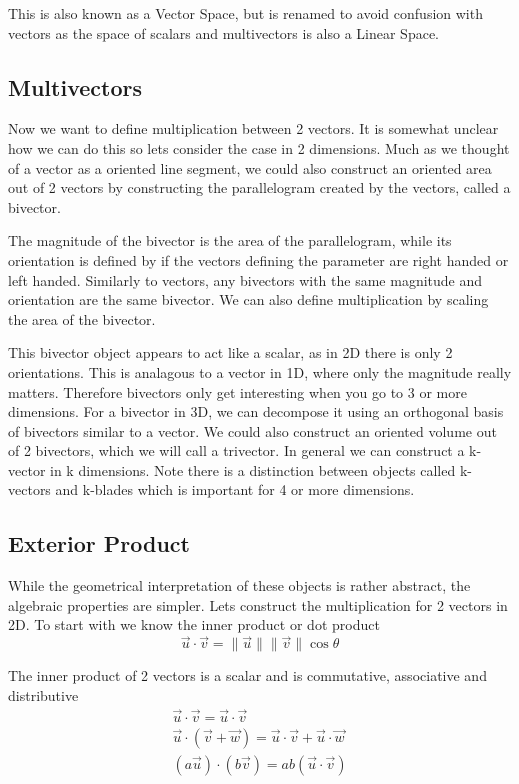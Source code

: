 \documentclass[options]{report}
\def \u{\vec{u}}
\def \v{\vec{v}}
\def \w{\vec{w}}
\newcommand{\norm}[1]{\lVert #1 \rVert}
\begin{document}
This is also known as a Vector Space, but is renamed to avoid confusion with vectors as the space of scalars and multivectors is also a Linear Space.

\subsection{Multivectors}
Now we want to define multiplication between 2 vectors. It is somewhat unclear how we can do this so lets consider the case in 2 dimensions. Much as we thought of a vector as a oriented line segment, we could also construct an oriented area out of 2 vectors by constructing the parallelogram created by the vectors, called a bivector.

The magnitude of the bivector is the area of the parallelogram, while its orientation is defined by if the vectors defining the parameter are right handed or left handed. Similarly to vectors, any bivectors with the same magnitude and orientation are the same bivector. We can also define multiplication by scaling the area of the bivector.

This bivector object appears to act like a scalar, as in 2D there is only 2 orientations. This is analagous to a vector in 1D, where only the magnitude really matters. Therefore bivectors only get interesting when you go to 3 or more dimensions. For a bivector in 3D, we can decompose it using an orthogonal basis of bivectors similar to a vector. We could also construct an oriented volume out of 2 bivectors, which we will call a trivector. In general we can construct a k-vector in k dimensions. Note there is a distinction between objects called k-vectors and k-blades which is important for 4 or more dimensions.

\subsection{Exterior Product}
While the geometrical interpretation of these objects is rather abstract, the algebraic properties are simpler. Lets construct the multiplication for 2 vectors in 2D. To start with we know the inner product or dot product
\begin{equation}
	\u \cdot \v = \norm{\u} \norm{\v} \cos \theta
\end{equation}

The inner product of 2 vectors is a scalar and is commutative, associative and distributive
\begin{equation}
	\begin{gathered}
		\u \cdot \v = \u \cdot \v \\
		\u \cdot (\v + \w) = \u \cdot \v + \u \cdot \w \\
		(a \u) \cdot (b \v) = ab (\u \cdot \v) \\
	\end{gathered}
\end{equation}
\end{document}
